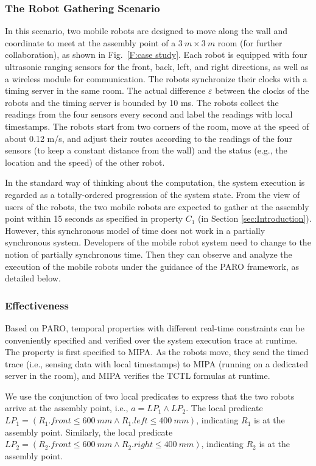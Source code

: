 \documentclass[10pt,conference,compsocconf,letterpaper]{IEEEtran}
\begin{document}
\subsubsection{The Robot Gathering Scenario}

In this scenario, two mobile robots are designed to move along the wall and coordinate to meet at the assembly point of a $3~m \times 3~m$ room (for further collaboration), as shown in Fig.~\ref{F:case study}. Each robot is equipped with four ultrasonic ranging sensors for the front, back, left, and right directions, as well as a wireless module for communication. The robots synchronize their clocks with a timing server in the same room. The actual difference $\varepsilon$ between the clocks of the robots and the timing server is bounded by 10 ms. The robots collect the readings from the four sensors every second and label the readings with local timestamps. The robots start from two corners of the room, move at the speed of about 0.12 m/s, and adjust their routes according to the readings of the four sensors (to keep a constant distance from the wall) and the status (e.g., the location and the speed) of the other robot.

In the standard way of thinking about the computation, the system execution is regarded as a totally-ordered progression of the system state. From the view of users of the robots, the two mobile robots are expected to gather at the assembly point within 15 seconds as specified in property $C_1$ (in Section \ref{sec:Introduction}). However, this synchronous model of time does not work in a partially synchronous system. Developers of the mobile robot system need to change to the notion of partially synchronous time. Then they can observe and analyze the execution of the mobile robots under the guidance of the \textsf{PARO} framework, as detailed below.

\subsubsection{Effectiveness}

Based on \textsf{PARO}, temporal properties with different real-time constraints can be conveniently specified and verified over the system execution trace at runtime. The property is first specified to MIPA. As the robots move, they send the timed trace (i.e., sensing data with local timestamps) to MIPA (running on a dedicated server in the room), and MIPA verifies the TCTL formulas at runtime.

We use the conjunction of two local predicates to express that the two robots arrive at the assembly point, i.e., $a = LP_1\wedge LP_2$. The local predicate $LP_1 = (R_1.front \leq 600~mm \wedge R_1.left \leq 400~mm)$, indicating $R_1$ is at the assembly point. Similarly, the local predicate $LP_2 = (R_2.front \leq 600~mm \wedge R_2.right \leq 400~mm)$, indicating $R_2$ is at the assembly point.
\end{document}
